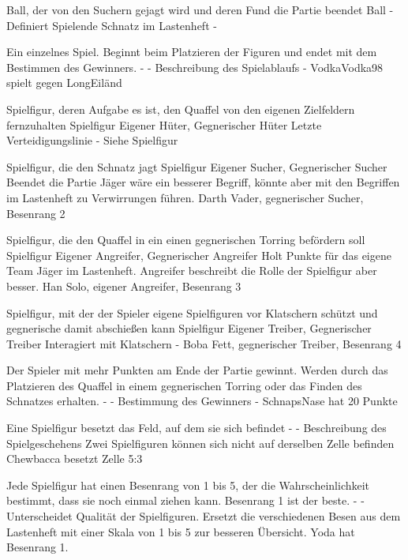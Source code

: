 {Ball, der von den Suchern gejagt wird und deren Fund die Partie beendet}
{Ball}
{-}
{Definiert Spielende}
{\glqq{}Schnatz\grqq{}  im Lastenheft}
{-}

{Ein einzelnes Spiel. Beginnt beim Platzieren der Figuren und endet mit dem Bestimmen des Gewinners.}
{-}
{-}
{Beschreibung des Spielablaufs}
{-}
{VodkaVodka98 spielt gegen LongEiländ}

{Spielfigur, deren Aufgabe es ist, den Quaffel von den eigenen Zielfeldern fernzuhalten}
{Spielfigur}
{Eigener Hüter, Gegnerischer Hüter}
{Letzte Verteidigungslinie}
{-}
{Siehe \glqq{}Spielfigur\grqq{} }

{Spielfigur, die den Schnatz jagt}
{Spielfigur}
{Eigener Sucher, Gegnerischer Sucher}
{Beendet die Partie}
{\glqq{}Jäger\grqq{}  wäre ein besserer Begriff, könnte aber mit den Begriffen im Lastenheft zu Verwirrungen führen.}
{Darth Vader, gegnerischer Sucher, Besenrang 2}

{Spielfigur, die den Quaffel in ein einen gegnerischen Torring befördern soll}
{Spielfigur}
{Eigener Angreifer, Gegnerischer Angreifer}
{Holt Punkte für das eigene Team}
{\glqq{}Jäger\grqq{}  im Lastenheft. Angreifer beschreibt die Rolle der Spielfigur aber besser.}
{Han Solo, eigener Angreifer, Besenrang 3}

{Spielfigur, mit der der Spieler eigene Spielfiguren vor Klatschern schützt und gegnerische damit abschießen kann}
{Spielfigur}
{Eigener Treiber, Gegnerischer Treiber}
{Interagiert mit Klatschern}
{-}
{Boba Fett, gegnerischer Treiber, Besenrang 4}

{Der Spieler mit mehr Punkten am Ende der Partie gewinnt. Werden durch das Platzieren des Quaffel in einem gegnerischen Torring oder das Finden des Schnatzes erhalten.}
{-}
{-}
{Bestimmung des Gewinners}
{-}
{SchnapsNase hat 20 Punkte}

{Eine Spielfigur besetzt das Feld, auf dem sie sich befindet}
{-}
{-}
{Beschreibung des Spielgeschehens}
{Zwei Spielfiguren können sich nicht auf derselben Zelle befinden}
{Chewbacca besetzt Zelle 5:3}

{Jede Spielfigur hat einen Besenrang von 1 bis 5, der die Wahrscheinlichkeit bestimmt, dass sie noch einmal ziehen kann. Besenrang 1 ist der beste.}
{-}
{-}
{Unterscheidet Qualität der Spielfiguren.}
{Ersetzt die verschiedenen \glqq{}Besen\grqq{} aus dem Lastenheft mit einer Skala von 1 bis 5 zur besseren Übersicht.}
{Yoda hat Besenrang 1.}

